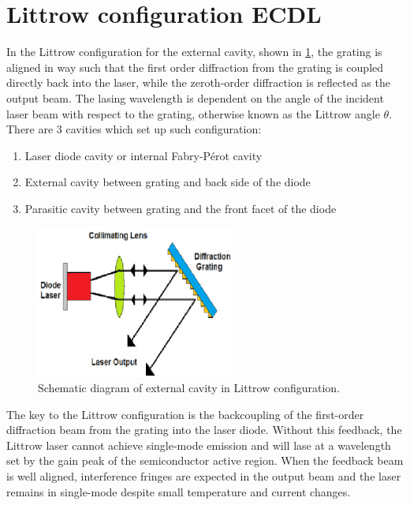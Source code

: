 \section{Littrow configuration ECDL}\label{Littrowsection}
In the Littrow configuration for the external cavity, shown in \cref{littrow2}, the grating is aligned in way such that the first order diffraction from the grating is coupled directly back into the laser, while the zeroth-order diffraction is reflected as the output beam. The lasing wavelength is dependent on the angle of the incident laser beam with respect to the grating, otherwise known as the Littrow angle $\theta$.
There are 3 cavities which set up such configuration:
\begin{enumerate}
\item Laser diode cavity or internal Fabry-P\'{e}rot cavity
\item External cavity between grating and back side of the diode 
\item Parasitic cavity between grating and the front facet of the diode
\end{enumerate}

\begin{figure}[!t]
\centering
\includegraphics[width=0.7\linewidth, height=5cm, draft=\foto]{eps/littrow2.eps}
\caption{Schematic diagram of external cavity in Littrow configuration.}
\label{littrow2}
\end{figure}

The key to the Littrow configuration is the backcoupling of the first-order diffraction beam from the grating into the laser diode. Without this feedback, the Littrow laser cannot achieve single-mode emission and will lase at a wavelength set by the gain peak of the semiconductor active region. When the feedback beam is well aligned, interference fringes are expected in the output beam and the laser remains in single-mode despite small temperature and current changes.

